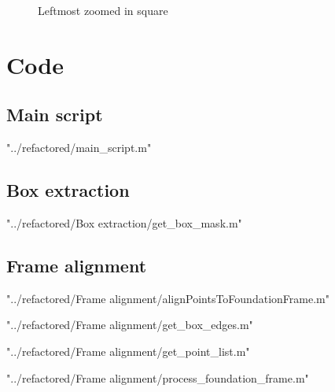 \documentclass[12pt,a4paper,onecolumn]{article}
\begin{document}
\begin{figure}[h!]
\centering
{}
\caption{Leftmost zoomed in square}
\label{fig:eval2b}
\end{figure}

\clearpage


\section{Code}
\label{apen:code_in}
\subsection{Main script}

{"../refactored/main_script.m"}

\subsection{Box extraction}

{"../refactored/Box extraction/get_box_mask.m"}

\subsection{Frame alignment}

{"../refactored/Frame alignment/alignPointsToFoundationFrame.m"}

{"../refactored/Frame alignment/get_box_edges.m"}

{"../refactored/Frame alignment/get_point_list.m"}

{"../refactored/Frame alignment/process_foundation_frame.m"}
\end{document}
